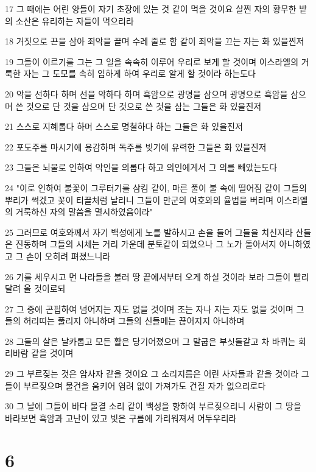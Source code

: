 \par 17 그 때에는 어린 양들이 자기 초장에 있는 것 같이 먹을 것이요 살찐 자의 황무한 밭의 소산은 유리하는 자들이 먹으리라
\par 18 거짓으로 끈을 삼아 죄악을 끌며 수레 줄로 함 같이 죄악을 끄는 자는 화 있을찐저
\par 19 그들이 이르기를 그는 그 일을 속속히 이루어 우리로 보게 할 것이며 이스라엘의 거룩한 자는 그 도모를 속히 임하게 하여 우리로 알게 할 것이라 하는도다
\par 20 악을 선하다 하며 선을 악하다 하며 흑암으로 광명을 삼으며 광명으로 흑암을 삼으며 쓴 것으로 단 것을 삼으며 단 것으로 쓴 것을 삼는 그들은 화 있을진저
\par 21 스스로 지혜롭다 하며 스스로 명철하다 하는 그들은 화 있을진저
\par 22 포도주를 마시기에 용감하며 독주를 빚기에 유력한 그들은 화 있을진저
\par 23 그들은 뇌물로 인하여 악인을 의롭다 하고 의인에게서 그 의를 빼았는도다
\par 24 "이로 인하여 불꽃이 그루터기를 삼킴 같이, 마른 풀이 불 속에 떨어짐 같이 그들의 뿌리가 썩겠고 꽃이 티끌처럼 날리니 그들이 만군의 여호와의 율법을 버리며 이스라엘의 거룩하신 자의 말씀을 멸시하였음이라"
\par 25 그러므로 여호와께서 자기 백성에게 노를 발하시고 손을 들어 그들을 치신지라 산들은 진동하며 그들의 시체는 거리 가운데 분토같이 되었으나 그 노가 돌아서지 아니하였고 그 손이 오히려 펴졌느니라
\par 26 기를 세우시고 먼 나라들을 불러 땅 끝에서부터 오게 하실 것이라 보라 그들이 빨리 달려 올 것이로되
\par 27 그 중에 곤핍하여 넘어지는 자도 없을 것이며 조는 자나 자는 자도 없을 것이며 그들의 허리띠는 풀리지 아니하며 그들의 신들메는 끊어지지 아니하며
\par 28 그들의 살은 날카롭고 모든 활은 당기어졌으며 그 말굽은 부싯돌같고 차 바퀴는 회리바람 같을 것이며
\par 29 그 부르짖는 것은 암사자 같을 것이요 그 소리지름은 어린 사자들과 같을 것이라 그들이 부르짖으며 물건을 움키어 염려 없이 가져가도 건질 자가 없으리로다
\par 30 그 날에 그들이 바다 물결 소리 같이 백성을 향하여 부르짖으리니 사람이 그 땅을 바라보면 흑암과 고난이 있고 빛은 구름에 가리워져서 어두우리라

\chapter{6}

